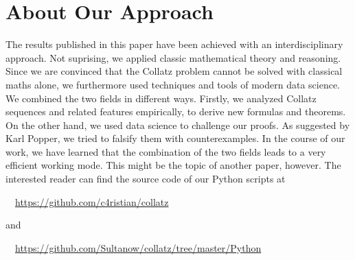 \chapter*{About Our Approach}
\vspace{0.8cm}

The results published in this paper have been achieved with an interdisciplinary approach. Not suprising, we applied classic mathematical theory and reasoning. Since we are convinced that the Collatz problem cannot be solved with classical maths alone, we furthermore used techniques and tools of modern data science. We combined the two fields in different ways. Firstly, we analyzed Collatz sequences and related features empirically, to derive new formulas and theorems. On the other hand, we used data science to challenge our proofs. As suggested by Karl Popper, we tried to falsify them with counterexamples. In the course of our work, we have learned that the combination of the two fields leads to a very efficient working mode. This might be the topic of another paper, however. The interested reader can find the source code of our Python scripts at

\par\medskip
\textcolor{wisogreen}\faExternalLink~~\url{https://github.com/c4ristian/collatz}

\par\medskip\noindent
and

\par\medskip
\textcolor{wisogreen}\faExternalLink~~\url{https://github.com/Sultanow/collatz/tree/master/Python}
